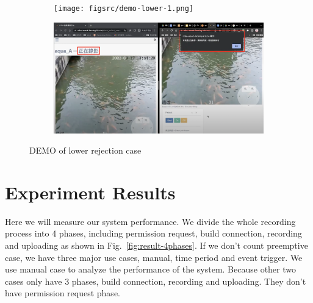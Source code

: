 \begin{figure}[H]
    \centering
    \begin{subfigure}{\textwidth}
        \texttt{[image: figsrc/demo-lower-1.png]}
        \label{fig:demo-lower-1}
    \end{subfigure}
\end{figure}

\begin{figure}[H]
    \ContinuedFloat
    \centering
    \begin{subfigure}{\textwidth}
        \includegraphics[width=\textwidth]{figsrc/demo-lower-2.png}
        \label{fig:demo-lower-2}
    \end{subfigure}

    \caption{DEMO of lower rejection case}
    \label{fig:demo-lower}
\end{figure}

\section{Experiment Results}
Here we will measure our system performance. We divide the whole recording process into 4 phases, including permission request, build connection, recording and uploading as shown in Fig.~\ref{fig:result-4phases}. If we don't count preemptive case, we have three major use cases, manual, time period and event trigger. We use manual case to analyze the performance of the system. Because other two cases only have 3 phases, build connection, recording and uploading. They don't have permission request phase.

